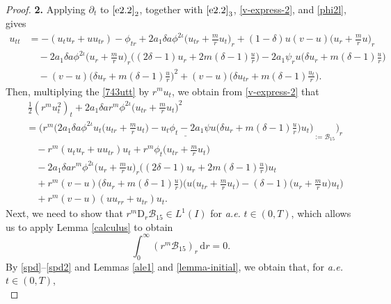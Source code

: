 \documentclass[11pt,reqno]{amsart}
\numberwithin{rk}{section}
\numberwithin{prop}{section}
\numberwithin{mydef}{section}
\numberwithin{lem}{section}
\numberwithin{equation}{section}
\numberwithin{thm}{section}
\begin{document}
\begin{proof}
\smallskip
\textbf{2.} Applying $\partial_t$ to $\eqref{e2.2}_2$, together with $\eqref{e2.2}_3$, \eqref{v-express-2}, and \eqref{phi2l}, gives
\begin{equation}\label{743utt}
\begin{aligned}
u_{tt}
&=-(u_tu_r+uu_{tr})-\phi_{tr}+2a_1\delta a \phi^{2\iota}\big(u_{tr}+\frac{m}{r}u_t\big)_{r}+(1-\delta)u(v-u)\big(u_r+\frac{m}{r}u\big)_r\\
&\quad -2a_1 \delta a \phi^{2\iota}\big(u_r+\frac{m}{r}u\big)_r\big((2\delta-1) u_r+2m(\delta-1)\frac{u}{r}\big)-2a_1  \psi_ru\big(\delta u_r+m(\delta-1)\frac{u}{r}\big) \\
&\quad - (v-u)\big(\delta u_r+ m(\delta-1)\frac{u}{r}\big)^2+(v-u)\big(\delta u_{tr}+ m(\delta-1)\frac{u_t}{r}\big).
\end{aligned}
\end{equation}
Then, multiplying the \eqref{743utt} by $r^mu_t$, we obtain from \eqref{v-express-2} that
\begin{equation}\label{eq:B10pre}
\begin{aligned}
&\,\frac{1}{2}(r^m u_t^2)_t+2a_1\delta a r^m\phi^{2\iota}\big(u_{tr}+ \frac{m}{r}u_t\big)^2\\
&=\Big(r^m \big(\underline{2a_1 \delta a \phi^{2\iota} u_t \big(u_{tr}+ \frac{m}{r}u_t\big)- u_t \phi_{t}-2a_1  \psi u\big(\delta u_r+m(\delta-1)\frac{u}{r}\big)u_t\big)}_{:=\mathcal{B}_{15}}\Big)_{r}\\
&\quad - r^m(u_tu_r+uu_{tr})u_t +r^m\phi_{t}\big(u_{tr}+\frac{m}{r}u_t\big)\\
&\quad -2a_1 \delta a r^m\phi^{2\iota}\big(u_r+\frac{m}{r}u\big)_r\big((2\delta-1) u_r +2m(\delta-1)\frac{u}{r}\big)u_t\\
&\quad +r^m(v-u)\big(\delta u_r+m(\delta-1)\frac{u}{r}\big)\Big(u\big(u_{tr}+\frac{m}{r}u_t\big)-(\delta-1)\big(u_r+\frac{m}{r}u\big) u_t\Big)\\
&\quad +r^m(v-u)(uu_{rr}+u_{tr})u_t.
\end{aligned}    
\end{equation}
Next, we need to  show that $r^m \mathrm{D}_r  \mathcal{B}_{15} \in L^1(I)$  for {\it a.e.} $t\in (0,T)$, which allows us to apply Lemma \ref{calculus} to obtain
\begin{equation}\label{eq:B10}
\int_0^\infty (r^m\mathcal{B}_{15})_r\,\mathrm{d}r =0.
\end{equation}
By \eqref{spd}--\eqref{spd2} and Lemmas \ref{ale1} and \ref{lemma-initial}, we obtain that, for {\it a.e.} $t\in (0,T)$,
\begin{equation*}

\end{equation*}
\end{proof}
\end{document}
